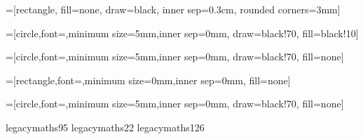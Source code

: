 \RequirePackage{pifont,manfnt}
\RequirePackage{booktabs}
\RequirePackage[T1]{fontenc}
\RequirePackage{mathpazo}
\RequirePackage{eulervm}
\RequirePackage{tikz}
\linespread{1.05}
\RequirePackage{xspace}
\RequirePackage{apacite}
\RequirePackage{rotating}
\RequirePackage{multirow}
\usepackage{fontawesome}
\usepackage{graphicx}
\usepackage{nth}

\newcommand{\Prob}[1]{\mathrm{P}( #1 )}
\newcommand{\dcat}[1]{\mathrm{dcat}( #1 )}
\newcommand{\ddirichlet}[1]{\mathrm{ddirichlet}( #1 )}
\newcommand*{\given}{\vert}

\newcommand\iidsim{\mathrel{\overset{\makebox[0pt]{\mbox{\normalfont\tiny iid}}}{\sim}}}
\newcommand\defeq{\mathrel{\overset{\makebox[0pt]{\mbox{\normalfont\tiny def}}}{=}}}
\newcommand{\hpd}{\textsc{hpd}\xspace}


\RequirePackage{tikz}
\usetikzlibrary{trees}
\usetikzlibrary{matrix}

\RequirePackage{amssymb,latexsym,amsmath,amsfonts,amscd}


\newcommand{\rreallytiny}{\fontsize{3}{3}\selectfont}
\newcommand{\reallytiny}{\fontsize{5}{5}\selectfont}

\usetikzlibrary{decorations.pathmorphing} %
\usetikzlibrary{fit}					%
\usetikzlibrary{backgrounds}	%
\usetikzlibrary{matrix}

=[rectangle, fill=none,
						draw=black,
                                                inner sep=0.3cm,
                                                rounded corners=3mm]

=[circle,font=\small,minimum size=5mm,inner sep=0mm,
                                    draw=black!70,
                                    fill=black!10]

=[circle,font=\small,minimum size=5mm,inner sep=0mm,
                                   draw=black!70,
                                    fill=none]

=[rectangle,font=\small,minimum size=0mm,inner sep=0mm,
                                    fill=none]

=[circle,font=\small,minimum size=5mm,inner sep=0mm,
                                   draw=black!70,
                                    fill=none]


\DeclareMathAccent{\dot}     {\mathalpha}{legacymaths}{95}
\DeclareMathAccent{\bar}     {\mathalpha}{legacymaths}{22}
\DeclareMathAccent{\tilde}     {\mathalpha}{legacymaths}{126}
